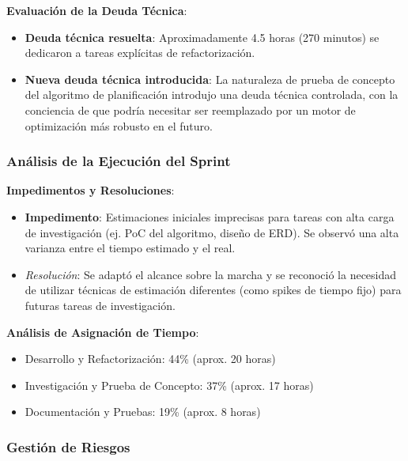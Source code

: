 \textbf{Evaluación de la Deuda Técnica}:
\begin{itemize}
    \item \textbf{Deuda técnica resuelta}: Aproximadamente 4.5 horas (270 minutos) se dedicaron a tareas explícitas de refactorización.
    \item \textbf{Nueva deuda técnica introducida}: La naturaleza de prueba de concepto del algoritmo de planificación introdujo una deuda técnica controlada, con la conciencia de que podría necesitar ser reemplazado por un motor de optimización más robusto en el futuro.
\end{itemize}

\subsubsection{Análisis de la Ejecución del Sprint}


\textbf{Impedimentos y Resoluciones}:
\begin{itemize}
    \item \textbf{Impedimento}: Estimaciones iniciales imprecisas para tareas con alta carga de investigación (ej. PoC del algoritmo, diseño de ERD). Se observó una alta varianza entre el tiempo estimado y el real.
    \item \textit{Resolución}: Se adaptó el alcance sobre la marcha y se reconoció la necesidad de utilizar técnicas de estimación diferentes (como spikes de tiempo fijo) para futuras tareas de investigación.
\end{itemize}

\textbf{Análisis de Asignación de Tiempo}:
\begin{itemize}
    \item Desarrollo y Refactorización: 44\% (aprox. 20 horas)
    \item Investigación y Prueba de Concepto: 37\% (aprox. 17 horas)
    \item Documentación y Pruebas: 19\% (aprox. 8 horas)
\end{itemize}

\subsubsection{Gestión de Riesgos}

